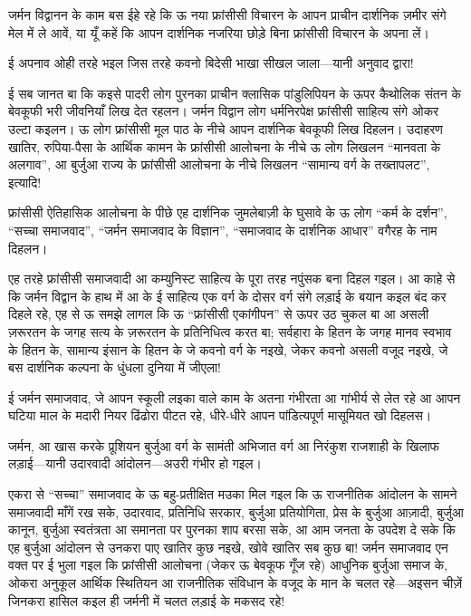 \documentclass[12pt,a4paper,oneside]{book}
\begin{document}
जर्मन विद्वानन के काम बस ईहे रहे कि ऊ नया फ्रांसीसी विचारन के आपन प्राचीन दार्शनिक ज़मीर संगे मेल में ले आवें, या यूँ कहें कि आपन दार्शनिक नजरिया छोड़े बिना फ्रांसीसी विचारन के अपना लें।

ई अपनाव ओही तरहे भइल जिस तरहे कवनो बिदेसी भाखा सीखल जाला—यानी अनुवाद द्वारा!

ई सब जानत बा कि कइसे पादरी लोग पुरनका प्राचीन क्लासिक पांडुलिपियन के ऊपर कैथोलिक संतन के बेवकूफी भरी जीवनियाँ लिख देत रहलन। जर्मन विद्वान लोग धर्मनिरपेक्ष फ्रांसीसी साहित्य संगे ओकर उल्टा कइलन। ऊ लोग फ्रांसीसी मूल पाठ के नीचे आपन दार्शनिक बेवकूफी लिख दिहलन। उदाहरण खातिर, रुपिया-पैसा के आर्थिक कामन के फ्रांसीसी आलोचना के नीचे ऊ लोग लिखलन “मानवता के अलगाव”, आ बुर्जुआ राज्य के फ्रांसीसी आलोचना के नीचे लिखलन “सामान्य वर्ग के तख्तापलट”, इत्यादि!

फ्रांसीसी ऐतिहासिक आलोचना के पीछे एह दार्शनिक जुमलेबाज़ी के घुसावे के ऊ लोग “कर्म के दर्शन”, “सच्चा समाजवाद”, “जर्मन समाजवाद के विज्ञान”, “समाजवाद के दार्शनिक आधार” वगैरह के नाम दिहलन।

एह तरहे फ्रांसीसी समाजवादी आ कम्युनिस्ट साहित्य के पूरा तरह नपुंसक बना दिहल गइल। आ काहे से कि जर्मन विद्वान के हाथ में आ के ई साहित्य एक वर्ग के दोसर वर्ग संगे लड़ाई के बयान कइल बंद कर दिहले रहे, एह से ऊ समझे लागल कि ऊ “फ्रांसीसी एकांगीपन” से ऊपर उठ चुकल बा आ असली ज़रूरतन के जगह सत्य के ज़रूरतन के प्रतिनिधित्व करत बा; सर्वहारा के हितन के जगह मानव स्वभाव के हितन के, सामान्य इंसान के हितन के जे कवनो वर्ग के नइखे, जेकर कवनो असली वजूद नइखे, जे बस दार्शनिक कल्पना के धुंधला दुनिया में जीएला!

ई जर्मन समाजवाद, जे आपन स्कूली लइका वाले काम के अतना गंभीरता आ गांभीर्य से लेत रहे आ आपन घटिया माल के मदारी नियर ढिंढोरा पीटत रहे, धीरे-धीरे आपन पांडित्यपूर्ण मासूमियत खो दिहलस।

जर्मन, आ खास करके प्रूशियन बुर्जुआ वर्ग के सामंती अभिजात वर्ग आ निरंकुश राजशाही के खिलाफ लड़ाई—यानी उदारवादी आंदोलन—अउरी गंभीर हो गइल।

एकरा से “सच्चा” समाजवाद के ऊ बहु-प्रतीक्षित मउका मिल गइल कि ऊ राजनीतिक आंदोलन के सामने समाजवादी माँगें रख सके, उदारवाद, प्रतिनिधि सरकार, बुर्जुआ प्रतियोगिता, प्रेस के बुर्जुआ आज़ादी, बुर्जुआ कानून, बुर्जुआ स्वतंत्रता आ समानता पर पुरनका शाप बरसा सके, आ आम जनता के उपदेश दे सके कि एह बुर्जुआ आंदोलन से उनकरा पाए खातिर कुछ नइखे, खोवे खातिर सब कुछ बा! जर्मन समाजवाद एन वक्त पर ई भुला गइल कि फ्रांसीसी आलोचना (जेकर ऊ बेवकूफ गूँज रहे) आधुनिक बुर्जुआ समाज के, ओकरा अनुकूल आर्थिक स्थितियन आ राजनीतिक संविधान के वजूद के मान के चलत रहे—अइसन चीज़ें जिनकरा हासिल कइल ही जर्मनी में चलत लड़ाई के मकसद रहे!
\end{document}
